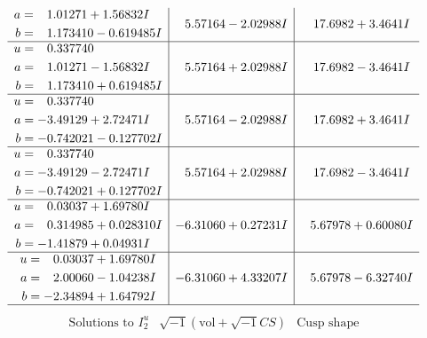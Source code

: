 \documentclass[1p]{elsarticle_modified}
\theoremstyle{definition}
\newcommand{\I}{\sqrt{-1}}
\begin{document}
$$\begin{array}{c|c|c}
\begin{aligned}
a &= \phantom{-}1.01271 + 1.56832 I \\
b &= \phantom{-}1.173410 - 0.619485 I\end{aligned}
 & \phantom{-}5.57164 - 2.02988 I & \phantom{-}17.6982 + 3.4641 I \\ \hline\begin{aligned}
u &= \phantom{-}0.337740\phantom{ +0.000000I} \\
a &= \phantom{-}1.01271 - 1.56832 I \\
b &= \phantom{-}1.173410 + 0.619485 I\end{aligned}
 & \phantom{-}5.57164 + 2.02988 I & \phantom{-}17.6982 - 3.4641 I \\ \hline\begin{aligned}
u &= \phantom{-}0.337740\phantom{ +0.000000I} \\
a &= -3.49129 + 2.72471 I \\
b &= -0.742021 - 0.127702 I\end{aligned}
 & \phantom{-}5.57164 - 2.02988 I & \phantom{-}17.6982 + 3.4641 I \\ \hline\begin{aligned}
u &= \phantom{-}0.337740\phantom{ +0.000000I} \\
a &= -3.49129 - 2.72471 I \\
b &= -0.742021 + 0.127702 I\end{aligned}
 & \phantom{-}5.57164 + 2.02988 I & \phantom{-}17.6982 - 3.4641 I \\ \hline\begin{aligned}
u &= \phantom{-}0.03037 + 1.69780 I \\
a &= \phantom{-}0.314985 + 0.028310 I \\
b &= -1.41879 + 0.04931 I\end{aligned}
 & -6.31060 + 0.27231 I & \phantom{-}5.67978 + 0.60080 I \\ \hline\begin{aligned}
u &= \phantom{-}0.03037 + 1.69780 I \\
a &= \phantom{-}2.00060 - 1.04238 I \\
b &= -2.34894 + 1.64792 I\end{aligned}
 & -6.31060 + 4.33207 I & \phantom{-}5.67978 - 6.32740 I\\
 \hline 
 \end{array}$$\newpage$$\begin{array}{c|c|c}  
\text{Solutions to }I^u_{2}& \I (\text{vol} + \sqrt{-1}CS) & \text{Cusp shape}\\
 \hline 
\begin{aligned}

\end{aligned}
\end{array}$$
\end{document}
